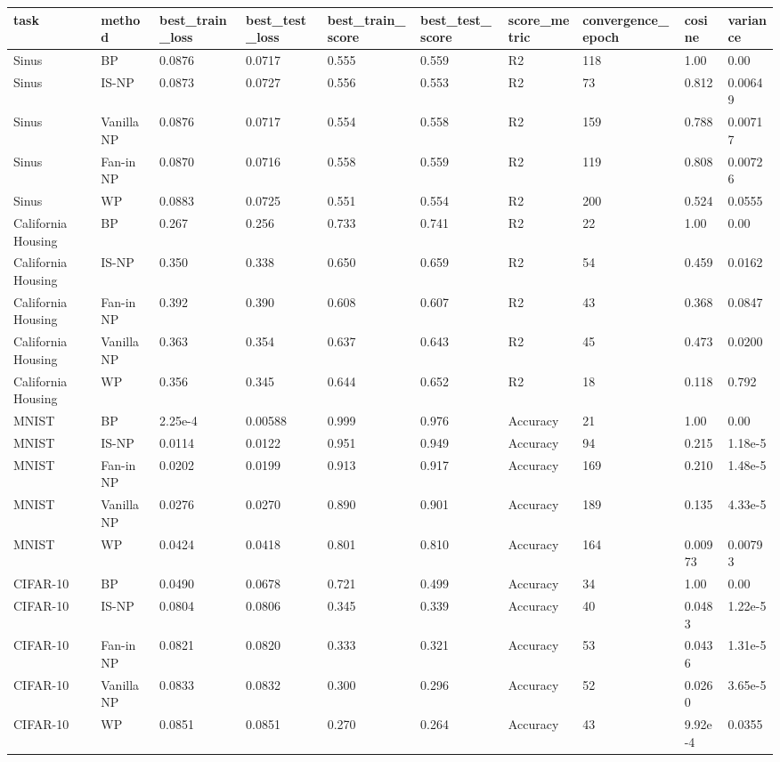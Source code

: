 \begin{tabular}{llllllllll}
\toprule
task & method & best\_train\_loss & best\_test\_loss & best\_train\_score & best\_test\_score & score\_metric & convergence\_epoch & cosine & variance \\
\midrule
Sinus & BP & 0.0876 & 0.0717 & 0.555 & 0.559 & R2 & 118 & 1.00 & 0.00 \\
Sinus & IS-NP & 0.0873 & 0.0727 & 0.556 & 0.553 & R2 & 73 & 0.812 & 0.00649 \\
Sinus & Vanilla NP & 0.0876 & 0.0717 & 0.554 & 0.558 & R2 & 159 & 0.788 & 0.00717 \\
Sinus & Fan-in NP & 0.0870 & 0.0716 & 0.558 & 0.559 & R2 & 119 & 0.808 & 0.00726 \\
Sinus & WP & 0.0883 & 0.0725 & 0.551 & 0.554 & R2 & 200 & 0.524 & 0.0555 \\
California Housing & BP & 0.267 & 0.256 & 0.733 & 0.741 & R2 & 22 & 1.00 & 0.00 \\
California Housing & IS-NP & 0.350 & 0.338 & 0.650 & 0.659 & R2 & 54 & 0.459 & 0.0162 \\
California Housing & Fan-in NP & 0.392 & 0.390 & 0.608 & 0.607 & R2 & 43 & 0.368 & 0.0847 \\
California Housing & Vanilla NP & 0.363 & 0.354 & 0.637 & 0.643 & R2 & 45 & 0.473 & 0.0200 \\
California Housing & WP & 0.356 & 0.345 & 0.644 & 0.652 & R2 & 18 & 0.118 & 0.792 \\
MNIST & BP & 2.25e-4 & 0.00588 & 0.999 & 0.976 & Accuracy & 21 & 1.00 & 0.00 \\
MNIST & IS-NP & 0.0114 & 0.0122 & 0.951 & 0.949 & Accuracy & 94 & 0.215 & 1.18e-5 \\
MNIST & Fan-in NP & 0.0202 & 0.0199 & 0.913 & 0.917 & Accuracy & 169 & 0.210 & 1.48e-5 \\
MNIST & Vanilla NP & 0.0276 & 0.0270 & 0.890 & 0.901 & Accuracy & 189 & 0.135 & 4.33e-5 \\
MNIST & WP & 0.0424 & 0.0418 & 0.801 & 0.810 & Accuracy & 164 & 0.00973 & 0.00793 \\
CIFAR-10 & BP & 0.0490 & 0.0678 & 0.721 & 0.499 & Accuracy & 34 & 1.00 & 0.00 \\
CIFAR-10 & IS-NP & 0.0804 & 0.0806 & 0.345 & 0.339 & Accuracy & 40 & 0.0483 & 1.22e-5 \\
CIFAR-10 & Fan-in NP & 0.0821 & 0.0820 & 0.333 & 0.321 & Accuracy & 53 & 0.0436 & 1.31e-5 \\
CIFAR-10 & Vanilla NP & 0.0833 & 0.0832 & 0.300 & 0.296 & Accuracy & 52 & 0.0260 & 3.65e-5 \\
CIFAR-10 & WP & 0.0851 & 0.0851 & 0.270 & 0.264 & Accuracy & 43 & 9.92e-4 & 0.0355 \\
\bottomrule
\end{tabular}
